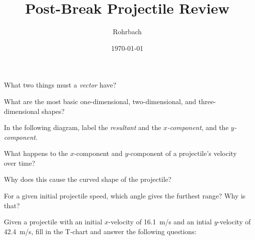 \documentclass[10pt]{exam}
\title{Post-Break Projectile Review}
\author{Rohrbach}
\date{\today}
\begin{document}
\maketitle

\begin{questions}
  
  \question 
    What two things must a \emph{vector} have?
    \vs
  
  \question
    What are the most basic one-dimensional, two-dimensional, and three-dimensional shapes?
    \vs

  \question 
    In the following diagram, label the \emph{resultant} and the \emph{$x$-component}, and the \emph{$y$-component}.

    \vspace{2em}
    \begin{center}
    \end{center}
    \vspace{2em}

  \question 
    What happens to the $x$-component and $y$-component of a projectile's velocity over time?  
    \vs
    
    
  \question
    Why does this cause the curved shape of the projectile?
    \vs

  \question
    For a given initial projectile speed, which angle gives the furthest range?  Why is that?
    \vs

  \pagebreak

  \question
    \def\velx{16.1}
    \def\vely{42.4}
    Given a projectile with an initial $x$-velocity of \velx~m/s and an intial $y$-velocity of \vely~m/s, fill in the T-chart and answer the following questions:

    \vspace{1em}


\end{questions}
\end{document}
